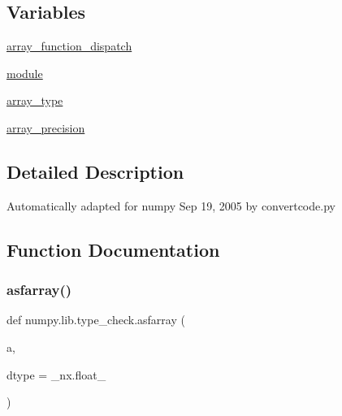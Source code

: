 \subsection*{Variables}
\begin{DoxyCompactItemize}
\item 
\hyperlink{namespacenumpy_1_1lib_1_1type__check_a25db2fa03bd3fb6ed8b645eec8868ff8}{array\+\_\+function\+\_\+dispatch}
\item 
\hyperlink{namespacenumpy_1_1lib_1_1type__check_af698e61f6ab0c4aeb9770c35b7434f42}{module}
\item 
\hyperlink{namespacenumpy_1_1lib_1_1type__check_adc750faf4b5f59edec5407fa9bbbcb1a}{array\+\_\+type}
\item 
\hyperlink{namespacenumpy_1_1lib_1_1type__check_ae26d7c0b903378781ceca15875ccf3ff}{array\+\_\+precision}
\end{DoxyCompactItemize}


\subsection{Detailed Description}
\begin{DoxyVerb}Automatically adapted for numpy Sep 19, 2005 by convertcode.py\end{DoxyVerb}
 

\subsection{Function Documentation}
\mbox{\label{namespacenumpy_1_1lib_1_1type__check_a853f135e392aa75e4324178f5760e297}} 
\subsubsection{\texorpdfstring{asfarray()}{asfarray()}}
{\footnotesize\ttfamily def numpy.\+lib.\+type\+\_\+check.\+asfarray (\begin{DoxyParamCaption}\item[{}]{a,  }\item[{}]{dtype = {\ttfamily \+\_\+nx.float\+\_\+} }\end{DoxyParamCaption})}

